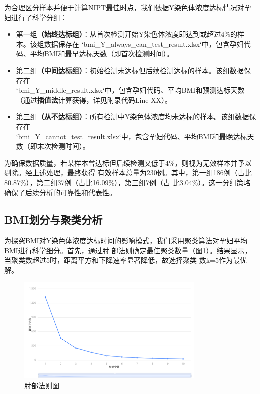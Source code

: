 \documentclass{article}
\begin{document}
为合理区分样本并便于计算NIPT最佳时点，我们依据Y染色体浓度达标情况对孕妇进行了科学分组：
\begin{itemize}
    \item 第一组\textbf{（始终达标组）}：从首次检测开始Y染色体浓度即达到或超过4\%的样本。该组数据保存在 `bmi\_Y\_always\_can\_test\_result.xlsx`中，包含孕妇代码、平均BMI和最早达标天数（即首次检测时间）。
    \item 第二组\textbf{（中间达标组）}：初始检测未达标但后续检测达标的样本。该组数据保存在 \\
          `bmi\_Y\_middle\_result.xlsx`中，包含孕妇代码、平均BMI和预测达标天数（通过\textbf{插值法}计算获得，详见附录代码Line XX）。
    \item 第三组\textbf{（从不达标组）}：所有检测中Y染色体浓度均未达标的样本。该组数据保存在 \\
          `bmi\_Y\_cannot\_test\_result.xlsx`中，包含孕妇代码、平均BMI和最晚达标天数（即末次检测时间）。
\end{itemize}

为确保数据质量，若某样本曾达标但后续检测又低于4\%，则视为无效样本并予以剔除。经上述处理，最终获得
有效样本总量为230例。其中，第一组186例（占比80.87\%），第二组37例（占比16.09\%），第三组7例（占
比3.04\%）。这一分组策略确保了后续分析的可靠性和代表性。

\subsection{\textbf{BMI划分与聚类分析}}
为探究BMI对Y染色体浓度达标时间的影响模式，我们采用聚类算法对孕妇平均BMI进行科学细分。首先，通过肘
部法则确定最佳聚类数量（图1）。结果显示，当聚类数超过5时，距离平方和下降速率显著降低，故选择聚类
数k=5作为最优解。
\begin{figure}[H]  %
    \centering  %
    \includegraphics[width=0.8\textwidth]{graph/zhoubu.png}  %
    \caption{肘部法则图}  %
    \label{fig:single}  %
\end{figure}
\end{document}
